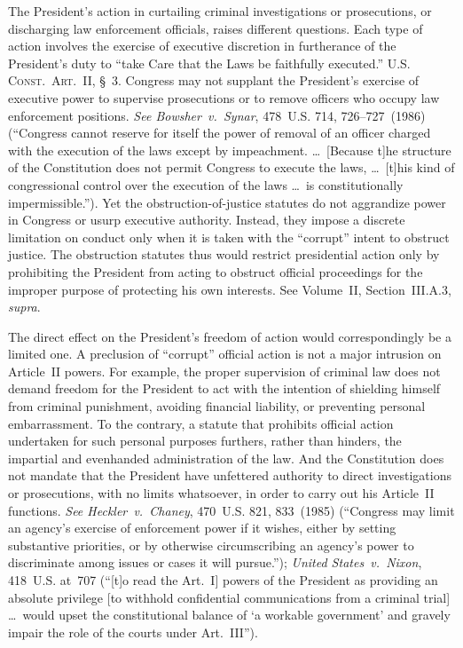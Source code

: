 The President's action in curtailing criminal investigations or prosecutions, or discharging law enforcement officials, raises different questions.
Each type of action involves the exercise of executive discretion in furtherance of the President's duty to ``take Care that the Laws be faithfully executed.''
\textsc{U.S. Const.\ Art.~II}, \S~3.
Congress may not supplant the President's exercise of executive power to supervise prosecutions or to remove officers who occupy law enforcement positions.
\textit{See Bowsher~v.\ Synar}, 478~U.S. 714, 726--727~(1986) (``Congress cannot reserve for itself the power of removal of an officer charged with the execution of the laws except by impeachment. \dots\ [Because t]he structure of the Constitution does not permit Congress to execute the laws, \dots\ [t]his kind of congressional control over the execution of the laws \dots\ is constitutionally impermissible.'').
Yet the obstruction-of-justice statutes do not aggrandize power in Congress or usurp executive authority.
Instead, they impose a discrete limitation on conduct only when it is taken with the ``corrupt'' intent to obstruct justice.
The obstruction statutes thus would restrict presidential action only by prohibiting the President from acting to obstruct official proceedings for the improper purpose of protecting his own interests.
See Volume~II, Section~III.A.3, \textit{supra}.

The direct effect on the President's freedom of action would correspondingly be a limited one.
A preclusion of ``corrupt'' official action is not a major intrusion on Article~II powers.
For example, the proper supervision of criminal law does not demand freedom for the President to act with the intention of shielding himself from criminal punishment, avoiding financial liability, or preventing personal embarrassment.
To the contrary, a statute that prohibits official action undertaken for such personal purposes furthers, rather than hinders, the impartial and evenhanded administration of the law.
And the Constitution does not mandate that the President have unfettered authority to direct investigations or prosecutions, with no limits whatsoever, in order to carry out his Article~II functions.
\textit{See Heckler~v.\ Chaney}, 470~U.S. 821, 833~(1985) (``Congress may limit an agency's exercise of enforcement power if it wishes, either by setting substantive priorities, or by otherwise circumscribing an agency's power to discriminate among issues or cases it will pursue.'');
\textit{United States~v.\ Nixon}, 418~U.S. at~707 (``[t]o read the Art.~I] powers of the President as providing an absolute privilege [to withhold confidential communications from a criminal trial] \dots\ would upset the constitutional balance of `a workable government' and gravely impair the role of the courts under Art.~III'').

